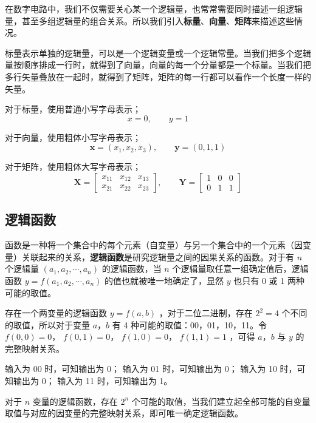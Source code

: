 在数字电路中，我们不仅需要关心某一个逻辑量，也常常需要同时描述一组逻辑量，甚至多组逻辑量的组合关系。所以我们引入\textbf{标量}、\textbf{向量}、\textbf{矩阵}来描述这些情况。

标量表示单独的逻辑量，可以是一个逻辑变量或一个逻辑常量。当我们把多个逻辑量按顺序排成一行时，就得到了向量，向量的每一个分量都是一个标量。当我们把多行矢量叠放在一起时，就得到了矩阵，矩阵的每一行都可以看作一个长度一样的矢量。

\begin{remark}{}{}
  对于标量，使用普通小写字母表示；
  $$x = 0,\qquad y = 1$$

  对于向量，使用粗体小写字母表示；
  $$\mathbf{x} = (x_1, x_2, x_3),\qquad \mathbf{y} = (0, 1, 1)$$

  对于矩阵，使用粗体大写字母表示；
  $$
    \mathbf{X} = \begin{bmatrix} x_{11} & x_{12} & x_{13} \\ x_{21} & x_{22} & x_{23} \end{bmatrix},
    \qquad
    \mathbf{Y} = \begin{bmatrix} 1 & 0 & 0 \\ 0 & 1 & 1 \end{bmatrix}
  $$
\end{remark}

\subsection{逻辑函数}

函数是一种将一个集合中的每个元素（自变量）与另一个集合中的一个元素（因变量）关联起来的关系，\textbf{逻辑函数}是研究逻辑量之间的因果关系的函数。对于有 $n$ 个逻辑量 $(a_1, a_2, \cdots, a_n)$ 的逻辑函数，当 $n$ 个逻辑量取任意一组确定值后，逻辑函数 $y = f(a_1, a_2, \cdots, a_n)$ 的值也就被唯一地确定了，显然 $y$ 也只有 0 或 1 两种可能的取值。

\begin{example}{}{}
  存在一个两变量的逻辑函数 $y = f(a, b)$ ，对于二位二进制，存在 $2 ^ 2 = 4$ 个不同的取值，所以对于变量 $a$，$b$ 有 4 种可能的取值：00，01，10，11。令 $f(0, 0) = 0$， $f(0, 1) = 0$， $f(1, 0) = 0$， $f(1, 1) = 1$ ，可得 $a$，$b$ 与 $y$ 的完整映射关系。

  输入为 00 时，可知输出为 0；
  输入为 01 时，可知输出为 0；
  输入为 10 时，可知输出为 0；
  输入为 11 时，可知输出为 1。
\end{example}

对于 $n$ 变量的逻辑函数，存在 $2 ^ n$ 个可能的取值，当我们建立起全部可能的自变量取值与对应的因变量的完整映射关系，即可唯一确定逻辑函数。

